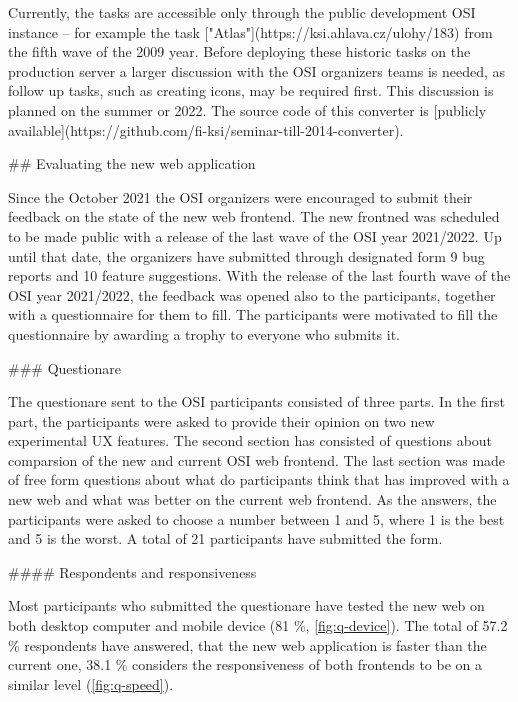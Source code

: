 \documentclass[
  digital, %
  oneside, %
  lof,     %
  lot,     %
]{fithesis4}
\begin{document}
{Currently, the tasks are accessible only through the public development OSI instance -- for example the task ["Atlas"](https://ksi.ahlava.cz/ulohy/183) from the fifth wave of the 2009 year. Before deploying these historic tasks on the production server a larger discussion with the OSI organizers teams is needed, as follow up tasks, such as creating icons, may be required first. This discussion is planned on the summer or 2022. The source code of this converter is [publicly available](https://github.com/fi-ksi/seminar-till-2014-converter).

## Evaluating the new web application

Since the October 2021 the OSI organizers were encouraged to submit their feedback on the state of the new web frontend. The new frontned was scheduled to be made public with a release of the last wave of the OSI year 2021/2022. Up until that date, the organizers have submitted through designated form 9 bug reports and 10 feature suggestions. With the release of the last fourth wave of the OSI year 2021/2022, the feedback was opened also to the participants, together with a questionnaire for them to fill. The participants were motivated to fill the questionnaire by awarding a trophy to everyone who submits it.

### Questionare

The questionare sent to the OSI participants consisted of three parts. In the first part, the participants were asked to provide their opinion on two new experimental UX features. The second section has consisted of questions about comparsion of the new and current OSI web frontend. The last section was made of free form questions about what do participants think that has improved with a new web and what was better on the current web frontend. As the answers, the participants were asked to choose a number between 1 and 5, where 1 is the best and 5 is the worst. A total of 21 participants have submitted the form.

#### Respondents and responsiveness

Most participants who submitted the questionare have tested the new web on both desktop computer and mobile device (81 \%, \autoref{fig:q-device}). The total of 57.2 \% respondents have answered, that the new web application is faster than the current one, 38.1 \% considers the responsiveness of both frontends to be on a similar level (\autoref{fig:q-speed}).

}
\end{document}
